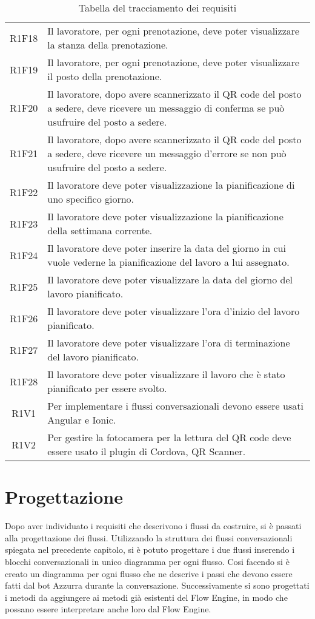 \begin{table}[h]%
	\centering
	\begin{tabularx}{\textwidth}{|c|X|}
		\hline		
		\rowcolor{giallo}
		\intest{Codice} &  \intest{Descrizione} \\	
		\hline	
		R1F18 & Il lavoratore, per ogni prenotazione, deve poter visualizzare la stanza della prenotazione.\\
		R1F19 & Il lavoratore, per ogni prenotazione, deve poter visualizzare il posto della prenotazione.\\	
		R1F20 & Il lavoratore, dopo avere scannerizzato il QR code del posto a sedere, deve ricevere un messaggio di conferma se può usufruire del posto a sedere.\\
		R1F21 & Il lavoratore, dopo avere scannerizzato il QR code del posto a sedere, deve ricevere un messaggio d'errore se non può usufruire del posto a sedere.\\
		R1F22 & Il lavoratore deve poter visualizzazione la pianificazione di uno specifico giorno.\\
		R1F23 & Il lavoratore deve poter visualizzazione la pianificazione della settimana corrente.\\
		R1F24 & Il lavoratore deve poter inserire la data del giorno in cui vuole vederne la pianificazione del lavoro a lui assegnato.\\
		R1F25 & Il lavoratore deve poter visualizzare la data del giorno del lavoro pianificato.\\
		R1F26 & Il lavoratore deve poter visualizzare l'ora d'inizio del lavoro pianificato.\\
		R1F27 & Il lavoratore deve poter visualizzare l'ora di terminazione del lavoro pianificato.\\
		R1F28 & Il lavoratore deve poter visualizzare il lavoro che è stato pianificato per essere svolto.\\
		R1V1 & Per implementare i flussi conversazionali devono essere usati Angular e Ionic.\\
		R1V2 & Per gestire la fotocamera per la lettura del QR code deve essere usato il plugin di Cordova, QR Scanner.\\

		\hline	
\end{tabularx} \hbox{}
\caption{Tabella del tracciamento dei requisiti}
\end{table}%
\section{Progettazione}
Dopo aver individuato i requisiti che descrivono i flussi da costruire, si è passati alla progettazione dei flussi. Utilizzando la struttura dei flussi conversazionali spiegata nel precedente capitolo, si è potuto progettare i due flussi inserendo i blocchi conversazionali in unico diagramma per ogni flusso. Cosi facendo si è creato un diagramma per ogni flusso che ne descrive i passi che devono essere fatti dal bot Azzurra durante la conversazione. Successivamente si sono progettati i metodi da aggiungere ai metodi già esistenti del Flow Engine, in modo che possano essere interpretare anche loro dal Flow Engine.


